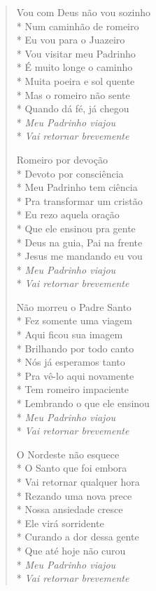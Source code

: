 \begin{verse}
Vou com Deus não vou sozinho\\*
Num caminhão de romeiro\\*
Eu vou para o Juazeiro\\*
Vou visitar meu Padrinho\\*
É muito longe o caminho\\*
Muita poeira e sol quente\\*
Mas o romeiro não sente\\*
Quando dá fé, já chegou\\*
\textit{Meu Padrinho viajou}\\*
\textit{Vai retornar brevemente}

Romeiro por devoção\\*
Devoto por consciência\\*
Meu Padrinho tem ciência\\*
Pra transformar um cristão\\*
Eu rezo aquela oração\\*
Que ele ensinou pra gente\\*
Deus na guia, Pai na frente\\*
Jesus me mandando eu vou\\*
\textit{Meu Padrinho viajou}\\*
\textit{Vai retornar brevemente}

Não morreu o Padre Santo\\*
Fez somente uma viagem\\*
Aqui ficou sua imagem\\*
Brilhando por todo canto\\*
Nós já esperamos tanto\\*
Pra vê-lo aqui novamente\\*
Tem romeiro impaciente\\*
Lembrando o que ele ensinou\\*
\textit{Meu Padrinho viajou}\\*
\textit{Vai retornar brevemente}

O Nordeste não esquece\\*
O Santo que foi embora\\*
Vai retornar qualquer hora\\*
Rezando uma nova prece\\*
Nossa ansiedade cresce\\*
Ele virá sorridente\\*
Curando a dor dessa gente\\*
Que até hoje não curou\\*
\textit{Meu Padrinho viajou}\\*
\textit{Vai retornar brevemente}


\end{verse}

